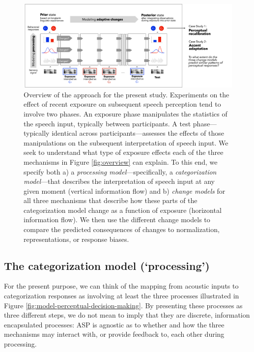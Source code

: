 \documentclass[
  11pt,
  man,floatsintext]{apa6}
\begin{document}
\begin{figure}[h]
\begin{center}
\includegraphics[width=.99\columnwidth]{../figures/diagrams/overview-of-changes.png}
\caption{Overview of the approach for the present study. Experiments on the effect of recent exposure on subsequent speech perception tend to involve two phases. An exposure phase manipulates the statistics of the speech input, typically between participants. A test phase---typically identical across participants---assesses the effects of those manipulations on the subsequent interpretation of speech input. We seek to understand what type of exposure effects each of the three mechanisms in Figure \ref{fig:overview} can explain. To this end, we specify both a) a {\em processing model}---specifically, a {\em categorization model}---that describes the interpretation of speech input at any given moment (vertical information flow) and b) {\em change models} for all three mechanisms that describe how these parts of the categorization model change as a function of exposure (horizontal information flow). We then use the different change models to compare the predicted consequences of changes to normalization, representations, or response biases.}\label{fig:overview-change}
\end{center}
\end{figure}

\hypertarget{the-categorization-model-processing}{%
\subsection{The categorization model (`processing')}\label{the-categorization-model-processing}}

For the present purpose, we can think of the mapping from acoustic inputs to categorization responses as involving at least the three processes illustrated in Figure \ref{fig:model-perceptual-decision-making}. By presenting these processes as three different steps, we do not mean to imply that they are discrete, information encapsulated processes: ASP is agnostic as to whether and how the three mechanisms may interact with, or provide feedback to, each other during processing.
\end{document}
